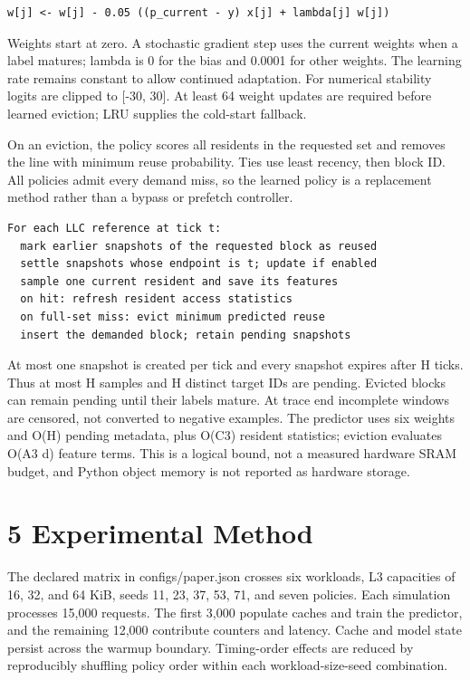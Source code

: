\documentclass[10pt,a4paper]{article}
\begin{document}
\begin{verbatim}
w[j] <- w[j] - 0.05 ((p_current - y) x[j] + lambda[j] w[j])
\end{verbatim}
Weights start at zero. A stochastic gradient step uses the current weights when a label matures; lambda is 0 for the bias and 0.0001 for other weights. The learning rate remains constant to allow continued adaptation. For numerical stability logits are clipped to [-30, 30]. At least 64 weight updates are required before learned eviction; LRU supplies the cold-start fallback.

On an eviction, the policy scores all residents in the requested set and removes the line with minimum reuse probability. Ties use least recency, then block ID. All policies admit every demand miss, so the learned policy is a replacement method rather than a bypass or prefetch controller.

\begin{verbatim}
For each LLC reference at tick t:
  mark earlier snapshots of the requested block as reused
  settle snapshots whose endpoint is t; update if enabled
  sample one current resident and save its features
  on hit: refresh resident access statistics
  on full-set miss: evict minimum predicted reuse
  insert the demanded block; retain pending snapshots
\end{verbatim}
At most one snapshot is created per tick and every snapshot expires after H ticks. Thus at most H samples and H distinct target IDs are pending. Evicted blocks can remain pending until their labels mature. At trace end incomplete windows are censored, not converted to negative examples. The predictor uses six weights and O(H) pending metadata, plus O(C3) resident statistics; eviction evaluates O(A3 d) feature terms. This is a logical bound, not a measured hardware SRAM budget, and Python object memory is not reported as hardware storage.

\section*{5 Experimental Method}
The declared matrix in configs/paper.json crosses six workloads, L3 capacities of 16, 32, and 64 KiB, seeds 11, 23, 37, 53, 71, and seven policies. Each simulation processes 15,000 requests. The first 3,000 populate caches and train the predictor, and the remaining 12,000 contribute counters and latency. Cache and model state persist across the warmup boundary. Timing-order effects are reduced by reproducibly shuffling policy order within each workload-size-seed combination.
\end{document}
